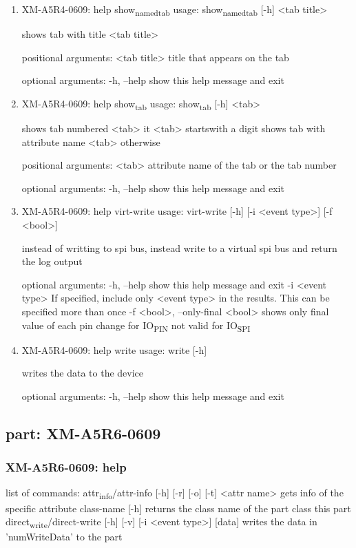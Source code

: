 \documentclass[11pt]{article}
\begin{document}
\begin{enumerate}
\item XM-A5R4-0609: help show\textsubscript{named}\textsubscript{tab}
\label{sec:org75dce7c}
usage: show\textsubscript{named}\textsubscript{tab} [-h] <tab title>

shows tab with title <tab title>

positional arguments:
  <tab title>  title that appears on the tab

optional arguments:
  -h, --help   show this help message and exit

\item XM-A5R4-0609: help show\textsubscript{tab}
\label{sec:orgaea0d48}
usage: show\textsubscript{tab} [-h] <tab>

shows tab numbered <tab> it <tab> startswith a digit shows tab with attribute
name <tab> otherwise

positional arguments:
  <tab>       attribute name of the tab or the tab number

optional arguments:
  -h, --help  show this help message and exit

\item XM-A5R4-0609: help virt-write
\label{sec:orge825902}
usage: virt-write [-h] [-i <event type>] [-f <bool>]

instead of writting to spi bus, instead write to a virtual spi bus and return
the log output

optional arguments:
  -h, --help            show this help message and exit
  -i <event type>       If specified, include only <event type> in the
                        results. This can be specified more than once
  -f <bool>, --only-final <bool>
                        shows only final value of each pin change for IO\textsubscript{PIN}
                        not valid for IO\textsubscript{SPI}

\item XM-A5R4-0609: help write
\label{sec:org4273650}
usage: write [-h]

writes the data to the device

optional arguments:
  -h, --help  show this help message and exit
\end{enumerate}

\subsection{part: XM-A5R6-0609}
\label{sec:orgf34d880}
\subsubsection{XM-A5R6-0609: help}
\label{sec:org48abd6f}
list of commands:
  attr\textsubscript{info}/attr-info [-h] [-r] [-o] [-t] <attr name>
    gets info of the specific attribute
  class-name [-h]
    returns the class name of the part class this part
  direct\textsubscript{write}/direct-write [-h] [-v] [-i <event type>] [data]
    writes the data in 'numWriteData' to the part
\end{document}
